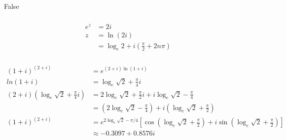 \documentclass{article}
\begin{document}
False

\setcounter{subsubsection}{8}
\subsubsection{}

\begin{align*}
  e^z & = 2 i                                                 \\
  z   & = \ln (2 i)                                           \\
      & = \log_e 2 + i \left( \frac{\pi}{2} + 2 n \pi \right)
\end{align*}

\setcounter{subsubsection}{10}
\subsubsection{}

\begin{align*}
  (1 + i)^{(2 + i)}                                        & = e^{(2 + i) \ln (1 + i)}                                                                                                                                    \\
  ln (1 + i)                                               & = \log_e \sqrt{2} + \frac{\pi}{4} i                                                                                                                          \\
  (2 + i) \left( \log_e \sqrt{2} + \frac{\pi}{4} i \right) & = 2 \log_e \sqrt{2} + \frac{\pi}{2} i + i \log_e \sqrt{2} - \frac{\pi}{4}                                                                                    \\
                                                           & = \left( 2 \log_e \sqrt{2} - \frac{\pi}{4} \right) + i \left( \log_e \sqrt{2} + \frac{\pi}{2} \right)                                                        \\
  (1 + i)^{(2 + i)}                                        & = e^{2 \log_e \sqrt{2} - \pi / 4} \left[ \cos \left( \log_e \sqrt{2} + \frac{\pi}{2} \right) + i \sin \left( \log_e \sqrt{2} + \frac{\pi}{2} \right) \right] \\
                                                           & \approx -0.3097 + 0.8576 i
\end{align*}

\setcounter{subsubsection}{12}
\subsubsection{}
\end{document}
